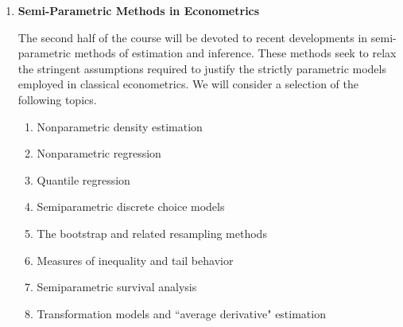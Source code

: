 \begin{enumerate}
\item {\bf Semi-Parametric Methods in Econometrics}

The second half of the course will be devoted to recent developments in 
semi-parametric methods of estimation and inference.  These methods seek to 
relax the stringent assumptions required to justify the strictly parametric 
models employed in classical econometrics.  We will consider a selection of
the following topics.

\begin{enumerate}
\item Nonparametric density estimation
\item Nonparametric regression
\item Quantile regression
\item Semiparametric discrete choice models
\item The bootstrap and related resampling methods
\item Measures of inequality and tail behavior
\item Semiparametric survival analysis
\item Transformation models and ``average derivative" estimation
\end{enumerate}


\end{enumerate}

